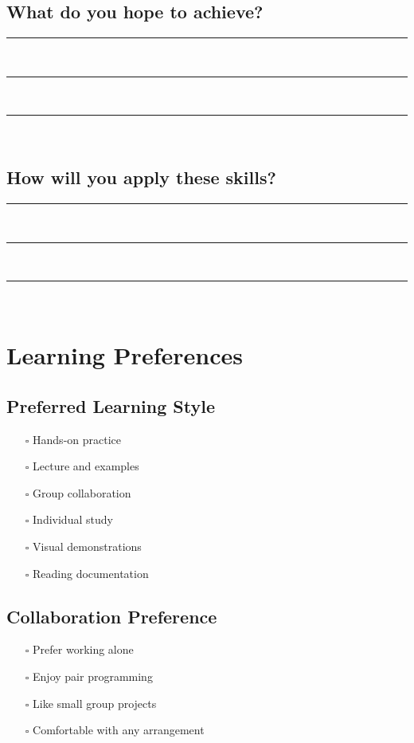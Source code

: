 \documentclass[11pt,a4paper]{article}
\begin{document}
\subsection{What do you hope to achieve?}
\rule{\textwidth}{0.4pt}\\[0.3cm]
\rule{\textwidth}{0.4pt}\\[0.3cm]
\rule{\textwidth}{0.4pt}\\[0.3cm]

\subsection{How will you apply these skills?}
\rule{\textwidth}{0.4pt}\\[0.3cm]
\rule{\textwidth}{0.4pt}\\[0.3cm]
\rule{\textwidth}{0.4pt}\\[0.3cm]

\section{Learning Preferences}

\subsection{Preferred Learning Style}
\begin{itemize}[leftmargin=0.5cm]
    \item[$\square$] Hands-on practice
    \item[$\square$] Lecture and examples
    \item[$\square$] Group collaboration
    \item[$\square$] Individual study
    \item[$\square$] Visual demonstrations
    \item[$\square$] Reading documentation
\end{itemize}

\subsection{Collaboration Preference}
\begin{itemize}[leftmargin=0.5cm]
    \item[$\square$] Prefer working alone
    \item[$\square$] Enjoy pair programming
    \item[$\square$] Like small group projects
    \item[$\square$] Comfortable with any arrangement
\end{itemize}
\end{document}
